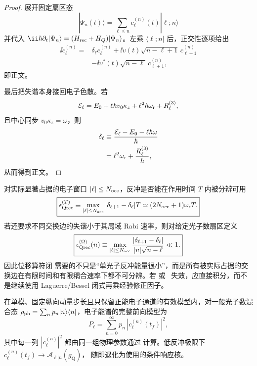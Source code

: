 \begin{proof}
展开固定扇区态
\begin{equation*}
|\Psi_n(t)\rangle
=\sum_{\ell\le n}c_\ell^{(n)}(t)|\ell;n\rangle
\end{equation*}
并代入
\(\ii\hbar\partial_t|\Psi_n\rangle=(H_{\rm rec}+H_Q)|\Psi_n\rangle\)。左乘 \(\langle\ell;n|\) 后，正交性逐项给出
\begin{align*}
\ii\dot c_\ell^{(n)}
={}&\delta_\ell c_\ell^{(n)}
+\ii\upsilon(t)\sqrt{n-\ell+1}\,c_{\ell-1}^{(n)}\\
&-\ii\upsilon^*(t)\sqrt{n-\ell}\,c_{\ell+1}^{(n)},
\end{align*}
即正文。

最后把失谐本身接回电子色散。若
\begin{equation*}
\mathcal E_\ell
=E_0+\ell\hbar v_0\kappa_z
+\ell^2\hbar\omega_{\rm r}+R_\ell^{(3)},
\end{equation*}
且中心同步 \(v_0\kappa_z=\omega\)，则
\begin{align*}
\delta_\ell
&\equiv\frac{\mathcal E_\ell-E_0-\ell\hbar\omega}{\hbar}\\
&=\ell^2\omega_{\rm r}+\frac{R_\ell^{(3)}}{\hbar},
\end{align*}
从而得到正文。
\end{proof}


对实际显著占据的电子窗口 $|\ell|\le N_{\rm occ}$，反冲是否能在作用时间 $T$ 内被分辨可用
\begin{equation}
\boxed{
 \epsilon_{\rm Qrec}^{(T)}
 \equiv\max_{|\ell|\le N_{\rm occ}}
 |\delta_{\ell+1}-\delta_\ell|T
 \simeq(2N_{\rm occ}+1)\omega_{\rm r}T.}
\label{eq:qpinem_recoil_time_control_dp46}
\end{equation}
若还要求不同交换边的失谐小于其局域 Rabi 速率，则对给定光子数扇区定义
\begin{equation}
\boxed{
 \epsilon_{\rm Qrec}^{(\Omega)}(n)
 \equiv
 \max_{|\ell|\le N_{\rm occ}}
 \frac{|\delta_{\ell+1}-\delta_\ell|}
 {|\upsilon|\sqrt{n-\ell}}
 \ll1.}
\label{eq:qpinem_recoil_rabi_control_dp46}
\end{equation}
因此位移算符闭 需要的不只是“单光子反冲能量很小”，而是所有被实际占据的交换边在有限时间和有限耦合速率下都不可分辨。若 或~ 失效，应直接积分，而不是继续使用 Laguerre/Bessel 闭式再乘经验修正因子。

在单模、固定纵向动量步长且只保留正能电子通道的有效模型内，对一般光子数混合态 $\rho_{\rm ph}=\sum_n p_n|n\rangle\langle n|$，电子能谱的完整前向模型为
\begin{equation}
\boxed{
 P_\ell
 =\sum_{n=0}^{\infty}p_n\,
 \left|c_\ell^{(n)}(t_f)\right|^2,}
\label{eq:qpinem_finite_recoil_number_forward_dp46}
\end{equation}
其中每一列 $|c_\ell^{(n)}|^2$ 都由同一组物理参数通过 计算。低反冲极限下
$c_\ell^{(n)}(t_f)\to\mathcal A_{\ell|n}(g_{\mathrm Q})$， 随即退化为使用的条件响应核。

